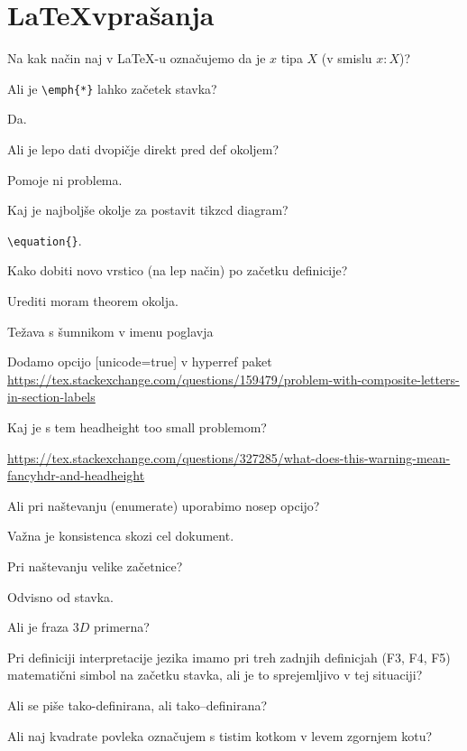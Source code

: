 \documentclass[12pt,a4paper]{article}
\newcommand\ans{\item[\textbf{A:}]}
\begin{document}
    \section*{\LaTeX vprašanja}
    \begin{vprasanja}
        \item Na kak način naj v \LaTeX -u označujemo da je $x$ tipa $X$ (v smislu $x:X$)?
        \ans
        \item Ali je \verb|\emph{*}| lahko začetek stavka?
        \ans Da.
        \item Ali je lepo dati dvopičje direkt pred def okoljem?
        \ans Pomoje ni problema.
        \item Kaj je najboljše okolje za postavit tikzcd diagram?
        \ans \verb|\equation{}|.
        \item Kako dobiti novo vrstico (na lep način) po začetku definicije?
        \ans Urediti moram theorem okolja.
        \item Težava s šumnikom v imenu poglavja
        \ans Dodamo opcijo [unicode=true] v hyperref paket
        \url{https://tex.stackexchange.com/questions/159479/problem-with-composite-letters-in-section-labels}
        \item Kaj je s tem headheight too small problemom?
        \ans \url{https://tex.stackexchange.com/questions/327285/what-does-this-warning-mean-fancyhdr-and-headheight}
        \item Ali pri naštevanju (enumerate) uporabimo nosep opcijo?
        \ans Važna je konsistenca skozi cel dokument.
        \item Pri naštevanju velike začetnice?
        \ans Odvisno od stavka.
        \item Ali je fraza $3D$ primerna?
        \ans
        \item Pri definiciji interpretacije jezika imamo pri treh zadnjih definicjah (F3, F4, F5) matematični simbol na začetku stavka,
            ali je to sprejemljivo v tej situaciji?
        \ans
        \item Ali se piše tako-definirana, ali tako--definirana?
        \ans
        \item Ali naj kvadrate povleka označujem s tistim kotkom v levem zgornjem kotu?
        \ans
    \end{vprasanja}
\end{document}
